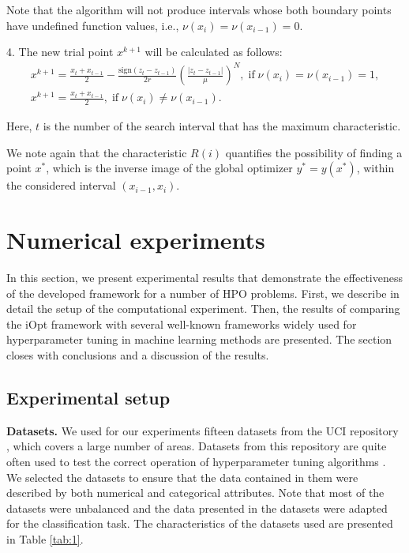 \documentclass[preprint,12pt]{elsarticle}
\begin{document}
Note that the algorithm will not produce intervals whose both boundary points have undefined function values, i.e., $\nu(x_i) = \nu(x_{i-1}) = 0$.

4. The new trial point $x^{k+1}$ will be calculated as follows:
\begin{gather}\label{xk1_int}
x^{k+1} = \frac{x_t+x_{t-1}}{2}- \frac{\mathrm{sign}(z_t-z_{t-1})}{2r} \left(\frac{\left|z_t-z_{t-1}\right|}{\mu}\right)^N, \; \mathrm{if} \; \nu(x_i) = \nu(x_{i-1}) = 1, \nonumber \\    
x^{k+1} = \frac{x_t+x_{t-1}}{2} , \; \mathrm{if} \; \nu(x_i) \neq \nu(x_{i-1}). \nonumber
\end{gather}

Here, $t$ is the number of the search interval that has the maximum characteristic.

We note again that the characteristic $R(i)$ quantifies the possibility of finding a point $x^*$, which is the inverse image of the global optimizer $y^* = y(x^*)$, within the considered interval $(x_{i-1},x_i)$.

\section{Numerical experiments}
\label{sec_exp}

In this section, we present experimental results that demonstrate the effectiveness of the developed framework for a number of HPO problems. First, we describe in detail the setup of the computational experiment. Then, the results of comparing the iOpt framework with several well-known frameworks widely used for hyperparameter tuning in machine learning methods are presented. The section closes with conclusions and a discussion of the results.

\subsection{Experimental setup}

\textbf{Datasets.} 
We used for our experiments fifteen datasets from the UCI repository \cite{UCI}, which covers a large number of areas. Datasets from this repository are quite often used to test the correct operation of hyperparameter tuning algorithms \cite{Joy2020,Wang2021,Wu2023}. We selected the datasets to ensure that the data contained in them were described by both numerical and categorical attributes. Note that most of the datasets were unbalanced and the data presented in the datasets were adapted for the classification task.  The characteristics of the datasets used are presented in Table \ref{tab:1}.
\end{document}
